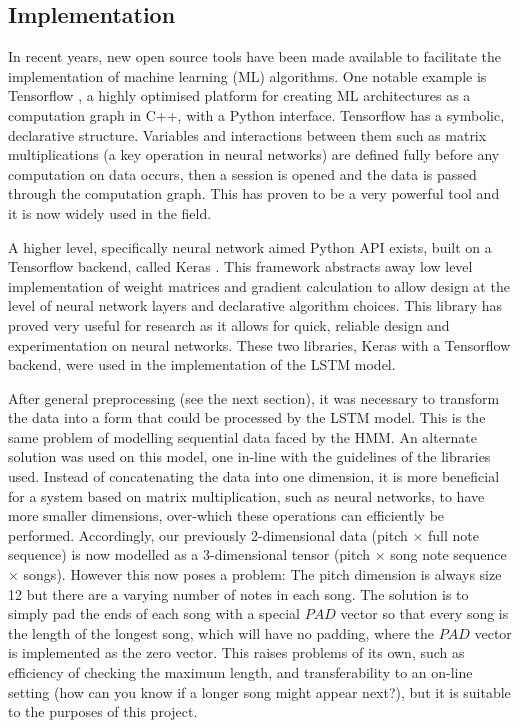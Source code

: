 \documentclass[bsc,singlespacing,logo, parskip, deptreport]{infthesis}
\begin{document}
\subsection{Implementation} \label{LSTM IMP}

In recent years, new open source tools have been made available to facilitate the implementation of machine learning (ML) algorithms. One notable example is Tensorflow \cite{tensorflow2015-whitepaper}, a highly optimised platform for creating ML architectures as a computation graph in C++, with a Python interface. Tensorflow has a symbolic, declarative structure. Variables and interactions between them such as matrix multiplications (a key operation in neural networks) are defined fully before any computation on data occurs, then a session is opened and the data is passed through the computation graph. This has proven to be a very powerful tool and it is now widely used in the field.

A higher level, specifically neural network aimed Python API exists, built on a Tensorflow backend, called Keras \cite{chollet2015}. This framework abstracts away low level implementation of weight matrices and gradient calculation to allow design at the level of neural network layers and declarative algorithm choices. This library has proved very useful for research as it allows for quick, reliable design and experimentation on neural networks. These two libraries, Keras with a Tensorflow backend, were used in the implementation of the LSTM model.

After general preprocessing (see the next section), it was necessary to transform the data into a form that could be processed by the LSTM model. This is the same problem of modelling sequential data faced by the HMM. An alternate solution was used on this model, one in-line with the guidelines of the libraries used. Instead of concatenating the data into one dimension, it is more beneficial for a system based on matrix multiplication, such as neural networks, to have more smaller dimensions, over-which these operations can efficiently be performed. Accordingly, our previously 2-dimensional data (pitch $\times$ full note sequence) is now modelled as a 3-dimensional tensor (pitch $\times$ song note sequence $\times$ songs). However this now poses a problem: The pitch dimension is always size 12 but there are a varying number of notes in each song. The solution is to simply pad the ends of each song with a special $PAD$ vector so that every song is the length of the longest song, which will have no padding, where the $PAD$ vector is implemented as the zero vector. This raises problems of its own, such as efficiency of checking the maximum length, and transferability to an on-line setting (how can you know if a longer song might appear next?), but it is suitable to the purposes of this project.
\end{document}

